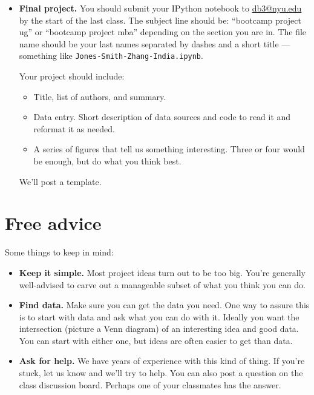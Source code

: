 \documentclass[11pt]{article}
\begin{document}
\begin{itemize}
\item {\bf Final project.}
You should submit your IPython notebook to \href{mailto:db3@nyu.edu}{db3@nyu.edu}
by the start of the last class.
The subject line should be:  ``bootcamp project ug'' or ``bootcamp project mba''
depending on the section you are in.
The file name should be your last names separated by dashes and a short title ---
something like {\tt Jones-Smith-Zhang-India.ipynb}.

Your project should include:
\begin{itemize}
\item Title, list of authors, and summary.
\item Data entry.  Short description of data sources and code to read it
and reformat it as needed.
\item A series of figures that tell us something interesting.
Three or four would be enough, but do what you think best.
\end{itemize}
We'll post a template.
\end{itemize}


\section*{Free advice}

Some things to keep in mind:
%
\begin{itemize}
\item {\bf Keep it simple.}
Most project ideas turn out to be too big.  You're generally well-advised
to carve out a manageable subset of what you think you can do.  

\item {\bf Find data.}  Make sure you can get the data you need.
One way to assure this is to start with data and ask what you can do with it.
Ideally you want the intersection (picture a Venn diagram) of an interesting
idea and good data.  You can start with either one, but ideas are often easier to
get than data.

\item {\bf Ask for help.}
We have years of experience with this kind of thing.
If you're stuck, let us know and we'll try to help.
You can also post a question on the class discussion board.
Perhaps one of your classmates has the answer.

\end{itemize}





\end{document}
